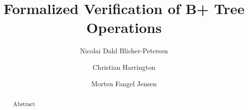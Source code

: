 \documentclass[oribibl]{llncs}
\begin{document}
\mainmatter
\title{Formalized Verification of B+ Tree Operations}
\author{Nicolai Dahl Blicher-Petersen \and Christian Harrington \and Morten Fangel Jensen \\
}

\maketitle

\begin{abstract}
Abstract
\end{abstract}









\end{document}
